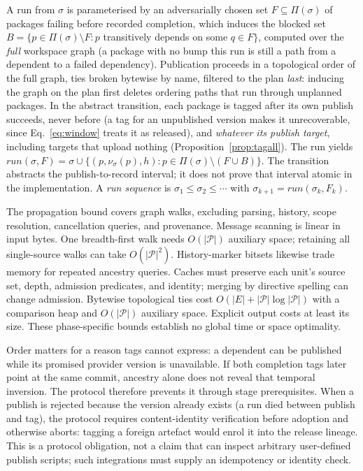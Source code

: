 \begin{definition}[run]
\label{def:run}
A run from $\sigma$ is parameterised by an adversarially chosen set
$F \subseteq \Pi(\sigma)$ of packages failing before recorded completion, which induces the
blocked set
$B = \{p \in \Pi(\sigma) \setminus F : p$ transitively depends on some
$q \in F\}$, computed over the \emph{full} workspace graph (a package
with no bump this run is still a path from a dependent to a failed
dependency). Publication proceeds in a topological order of the full
graph, ties broken bytewise by name, filtered to the plan \emph{last}:
inducing the graph on the plan first deletes ordering paths that run
through unplanned packages. In the abstract transition, each package is tagged after its
own publish succeeds, never before (a tag for an unpublished version
makes it unrecoverable, since Eq.~\ref{eq:window} treats it as
released), and \emph{whatever its publish target},
including targets that upload nothing
(Proposition~\ref{prop:tagall}). The run yields
$\mathit{run}(\sigma,F) = \sigma \cup \{(p, \nu_\sigma(p), h) : p \in
\Pi(\sigma) \setminus (F \cup B)\}$. The transition abstracts the publish-to-record interval; it does not
prove that interval atomic in the implementation. A \emph{run sequence} is
$\sigma_1 \leq \sigma_2 \leq \cdots$ with $\sigma_{k+1} =
\mathit{run}(\sigma_k, F_k)$.
\end{definition}

The propagation bound covers graph walks, excluding parsing, history, scope
resolution, cancellation queries, and provenance. Message scanning is linear
in input bytes. One breadth-first walk needs $O(|\mathcal{P}|)$ auxiliary
space; retaining all single-source walks can take $O(|\mathcal{P}|^2)$.
History-marker bitsets likewise trade memory for repeated ancestry queries.
Caches must preserve each unit's source set, depth, admission predicates, and
identity; merging by directive spelling can change admission. Bytewise
topological ties cost $O(|E|+|\mathcal{P}|\log|\mathcal{P}|)$ with a comparison
heap and $O(|\mathcal{P}|)$ auxiliary space. Explicit output costs at least
its size. These phase-specific bounds establish no global time or space optimality.

Order matters for a reason tags cannot express: a dependent can be published
while its promised provider version is unavailable. If both completion tags
later point at the same commit, ancestry alone does not reveal that temporal
inversion. The protocol therefore prevents it through stage prerequisites. When a
publish is rejected because the version already exists (a run died
between publish and tag), the protocol requires content-identity verification
before adoption and otherwise aborts: tagging a foreign artefact would enrol
it into the release lineage. This is a protocol obligation, not a claim that
\tool{} can inspect arbitrary user-defined publish scripts; such integrations
must supply an idempotency or identity check.

